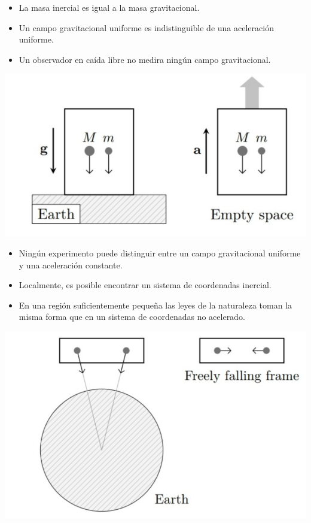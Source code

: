 \documentclass[../main]{subfiles}
\begin{document}
\begin{itemize}
    \item La masa inercial es igual a la masa gravitacional.
    \item Un campo gravitacional uniforme es indistinguible de una aceleración uniforme.
    \item Un observador en caída libre no medira ningún campo gravitacional.
\end{itemize}
\begin{center}
    \includegraphics[scale=0.5]{img/imgRG2.1.PNG}
\end{center}

\begin{itemize}
    \item Ningún experimento puede distinguir entre un campo gravitacional uniforme y una aceleración constante.
    \item Localmente, es posible encontrar un sistema de coordenadas inercial.
    \item En una región suficientemente pequeña las leyes de la naturaleza toman la misma forma que en un sistema de coordenadas no acelerado.
\end{itemize}
\begin{center}
    \includegraphics[scale=0.4]{img/imgRG2.2.PNG}
\end{center}
\end{document}
